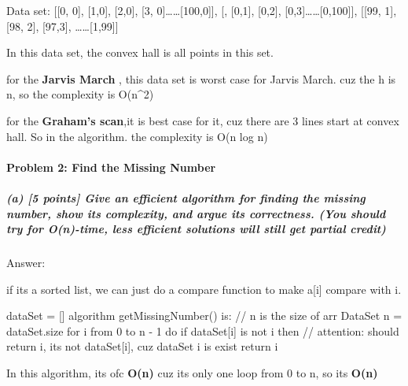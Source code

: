 \documentclass[
]{article}
\newenvironment{Shaded}{}{}
\newcommand{\NormalTok}[1]{#1}
\begin{document}
Data set: {[}{[}0, 0{]}, {[}1,0{]}, {[}2,0{]}, {[}3,
0{]}\ldots\ldots{[}100,0{]}{]}, {[}, {[}0,1{]}, {[}0,2{]},
{[}0,3{]}\ldots\ldots{[}0,100{]}{]}, {[}{[}99, 1{]},{[}98, 2{]},
{[}97,3{]}, \ldots\ldots{[}1,99{]}{]}

In this data set, the convex hall is all points in this set.

for the \textbf{Jarvis March} , this data set is worst case for Jarvis
March. cuz the h is n, so the complexity is O(n\^{}2)

for the \textbf{Graham's scan},it is best case for it, cuz there are 3
lines start at convex hall. So in the algorithm. the complexity is O(n
log n)

\hypertarget{problem-2-find-the-missing-number}{%
\paragraph{Problem 2: Find the Missing
Number}\label{problem-2-find-the-missing-number}}

\hypertarget{a-5-points-give-an-efficient-algorithm-for-finding-the-missing-number-show-its-complexity-and-argue-its-correctness-you-should-try-for-on-time-less-efficient-solutions-will-still-get-partial-credit}{%
\subparagraph{(a) {[}5 points{]} Give an efficient algorithm for finding
the missing number, show its complexity, and argue its correctness. (You
should try for O(n)-time, less efficient solutions will still get
partial
credit)}\label{a-5-points-give-an-efficient-algorithm-for-finding-the-missing-number-show-its-complexity-and-argue-its-correctness-you-should-try-for-on-time-less-efficient-solutions-will-still-get-partial-credit}}

Answer:

if its a sorted list, we can just do a compare function to make a{[}i{]}
compare with i.

\begin{Shaded}
\begin{Highlighting}[]
\NormalTok{dataSet = []}
\NormalTok{algorithm getMissingNumber() is:}
\NormalTok{	// n is the size of arr DataSet}
\NormalTok{	n = dataSet.size}
\NormalTok{	for i from 0 to n {-} 1 do}
\NormalTok{  	if dataSet[i] is not i then}
\NormalTok{  		// attention: should return i, its not dataSet[i], cuz dataSet i is exist}
\NormalTok{  		return i}
	
\end{Highlighting}
\end{Shaded}

In this algorithm, its ofc \textbf{O(n)} cuz its only one loop from 0 to
n, so its \textbf{O(n)}
\end{document}
